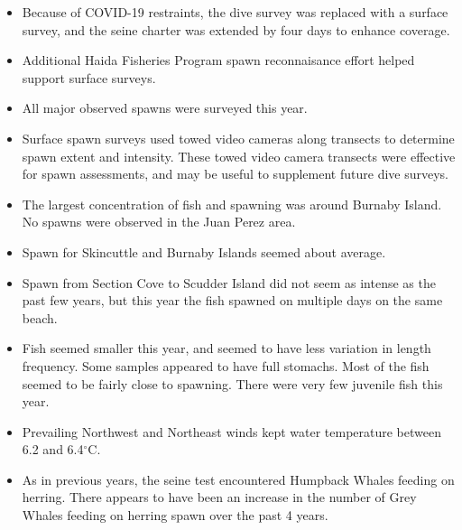 \begin{itemize}

\item Because of COVID-19 restraints, the dive survey was replaced with a surface survey, and the seine charter was extended by four days to enhance coverage.

\item Additional Haida Fisheries Program spawn reconnaisance effort helped support surface surveys.

\item All major observed spawns were surveyed this year.

\item Surface spawn surveys used towed video cameras along transects to determine spawn extent and intensity.
These towed video camera transects were effective for spawn assessments, and may be useful to supplement future dive surveys.

\item The largest concentration of fish and spawning was around Burnaby Island.
No spawns were observed in the Juan Perez area.

\item Spawn for Skincuttle and Burnaby Islands seemed about average.

\item Spawn from Section Cove to Scudder Island did not seem as intense as the past few years,
but this year the fish spawned on multiple days on the same beach.

\item Fish seemed smaller this year, and seemed to have less variation in length frequency.
Some samples appeared to have full stomachs.
Most of the fish seemed to be fairly close to spawning.
There were very few juvenile fish this year.

\item Prevailing Northwest and Northeast winds kept water temperature between 6.2 and 6.4$^\circ\text{C}$.

\item As in previous years, the seine test encountered Humpback Whales feeding on herring.
There appears to have been an increase in the number of Grey Whales feeding on herring spawn over the past 4 years.

\end{itemize}
